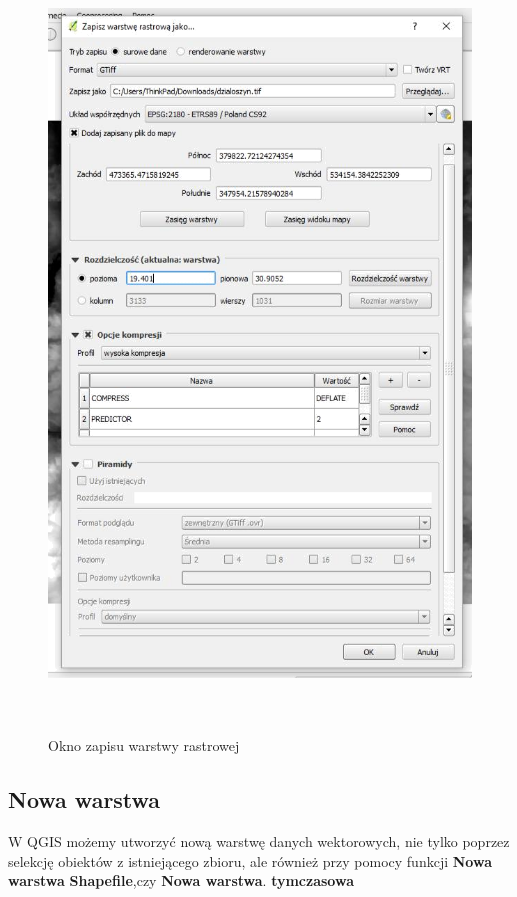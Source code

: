\documentclass[12pt,a4paper]{book}
\begin{document}
\begin{center}
\begin{figure}
\includegraphics[width=13cm,height=20.546cm]{002-zapisz-raster.png}
\caption{Okno zapisu warstwy rastrowej}
\end{figure}
\end{center}

\subsection[Nowa warstwa]{Nowa warstwa}
W QGIS możemy utworzyć nową warstwę danych wektorowych, nie tylko poprzez
selekcję obiektów z istniejącego zbioru, ale również przy pomocy funkcji \textbf{Nowa warstwa} \textbf{Shapefile},czy \textbf{Nowa warstwa}.\textbf{ tymczasowa}
\end{document}
